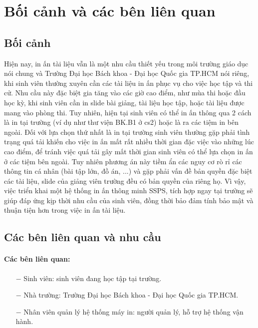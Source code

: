 \documentclass[a4paper]{article}
\begin{document}
\newpage

\section{Bối cảnh và các bên liên quan}
\subsection{Bối cảnh}
Hiện nay, in ấn tài liệu vẫn là một nhu cầu thiết yếu trong môi trường giáo dục nói chung và Trường Đại học Bách khoa - Đại học Quốc gia TP.HCM nói riêng, khi sinh viên thường xuyên cần các tài liệu in ấn phục vụ cho việc học tập và thi cử. Nhu cầu này đặc biệt gia tăng vào các giờ cao điểm, như mùa thi hoặc đầu học kỳ, khi sinh viên cần in slide bài giảng, tài liệu học tập, hoặc tài liệu được mang vào phòng thi. Tuy nhiên, hiện tại sinh viên có thể in ấn thông qua 2 cách là in tại trường (ví dụ như thư viện BK.B1 ở cs2) hoặc là ra các tiệm in bên ngoài. Đối với lựa chọn thứ nhất là in tại trường sinh viên thường gặp phải tình trạng quá tải khiến cho việc in ấn mất rất nhiều thời gian đặc việc vào những lúc cao điểm, để tránh việc quá tải gây mất thời gian sinh viên có thể lựa chọn in ấn ở các tiệm bên ngoài. Tuy nhiên phương án này tiềm ẩn các nguy cơ rò rỉ các thông tin cá nhân (bài tập lớn, đồ án, ...) và gặp phải vấn đề bản quyền đặc biệt các tài liệu, slide của giảng viên trường đều có bản quyền của riêng họ. Vì vậy, việc triển khai một hệ thống in ấn thông minh SSPS, tích hợp ngay tại trường sẽ giúp đáp ứng kịp thời nhu cầu của sinh viên, đồng thời bảo đảm tính bảo mật và thuận tiện hơn trong việc in ấn tài liệu.

\subsection{Các bên liên quan và nhu cầu}
\paragraph*{Các bên liên quan:}
\begin{itemize}
    \item[$-$] Sinh viên: sinh viên đang học tập tại trường.
    \item[$-$] Nhà trường: Trường Đại học Bách khoa - Đại học Quốc gia TP.HCM.
    \item[$-$] Nhân viên quản lý hệ thống máy in: người quản lý, hỗ trợ hệ thống vận hành.
\end{itemize}
\end{document}
